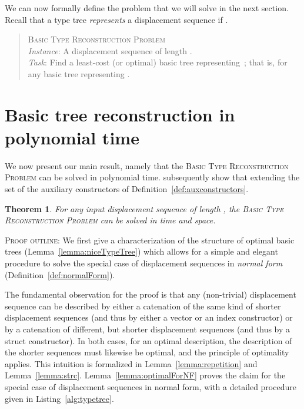 \documentclass[a4paper,11pt]{article}
\newtheorem{theorem}{Theorem}
\begin{document}
We can now formally define the problem that we will solve in the next
section. Recall that a type tree  \emph{represents} a displacement
sequence  if .
\begin{center}
  \begin{boxedminipage}[t]{\textwidth}
  \begin{quote}
  \textsc{Basic Type Reconstruction Problem}\\ \nopagebreak
  \emph{Instance}: A displacement sequence  of length .\\ \nopagebreak
  \emph{Task}: Find a least-cost (or optimal) basic tree  representing~; that is,  for any basic tree  representing .
\end{quote}
\end{boxedminipage}
\end{center}
\medskip

\section{Basic tree reconstruction in polynomial time}
\label{sec:treereconstruc}

We now present our main result, namely that the \textsc{Basic Type
  Reconstruction Problem} can be solved in polynomial time. subsequently show that extending the set of the auxiliary constructors
of Definition~\ref{def:auxconstructors}.

\begin{theorem}
\label{thm:polytree}
For any input displacement sequence  of length , the
\textsc{Basic Type Reconstruction Problem} can be solved in 
time and  space.
\end{theorem}

\textsc{Proof outline:} We first give a characterization of the
structure of optimal basic trees (Lemma~\ref{lemma:niceTypeTree})
which allows for a simple and elegant procedure to solve the special
case of displacement sequences in \emph{normal form}
(Definition~\ref{def:normalForm}).

The fundamental observation for the proof is that any (non-trivial)
displacement sequence can be described by either a catenation of the
same kind of shorter displacement sequences (and thus by either a
vector or an index constructor) or by a catenation of different, but
shorter displacement sequences (and thus by a struct constructor). In
both cases, for an optimal description, the description of the shorter
sequences must likewise be optimal, and the principle of optimality
applies. This intuition is formalized in Lemma~\ref{lemma:repetition}
and Lemma~\ref{lemma:strc}. Lemma~\ref{lemma:optimalForNF} proves the
claim for the special case of displacement sequences in normal form,
with a detailed procedure given in Listing~\ref{alg:typetree}.
\end{document}
